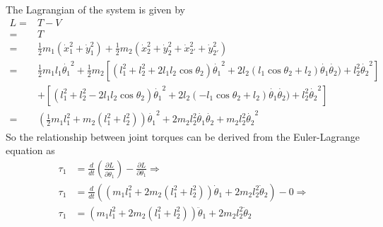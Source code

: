 \documentclass[conference,onecolumn]{IEEEtran}
\begin{document}
\begin{enumerate}
\begin{enumerate}
                        The Lagrangian of the system is given by
                        \begin{align*}
                              L  = & T - V                                                                                                                                                                                                                     \\
                              =    & T                                                                                                                                                                                                                         \\
                              =    & \frac{1}{2} m_1 (\dot{x}_1^2 + \dot{y}_1^2) + \frac{1}{2} m_2 (\dot{x}_2^2 + \dot{y}_2^2 + \dot{x}_{2'}^2 + \dot{y}_{2'}^2)                                                                                               \\
                              =    & \frac{1}{2} m_1 l_1 \dot{\theta_1}^2 + \frac{1}{2} m_2 \left[ (l_1^2 + l_2^2 + 2 l_1 l_2 \cos \theta_2) \dot{\theta_1}^2 + 2 l_2 (l_1 \cos \theta_2 + l_2) \dot{\theta_1}\dot{\theta_2}) + l_2^2 \dot{\theta_2}^2 \right] \\
                                   & + \left[ (l_1^2 + l_2^2 - 2 l_1 l_2 \cos \theta_2) \dot{\theta_1}^2 + 2 l_2 (- l_1 \cos \theta_2 + l_2) \dot{\theta_1}\dot{\theta_2}) + l_2^2 \dot{\theta_2}^2 \right]                                                    \\
                              =    & \left( \frac{1}{2} m_1 l_1^2 + m_2 (l_1^2 + l_2^2) \right) \dot{\theta_1}^2 + 2 m_2 l_2^2 \dot{\theta_1} \dot{\theta_2} + m_2 l_2^2 \dot{\theta_2}^2
                        \end{align*}
                        So the relationship between joint torques can be derived from the Euler-Lagrange equation as
                        \begin{align*}
                              \tau_1 & = \frac{d}{dt} \left( \frac{\partial L}{\partial \dot{\theta}_1} \right) - \frac{\partial L}{\partial \theta_1} \Rightarrow                \\
                              \tau_1 & = \frac{d}{dt} \left( \left( m_1 l_1^2 + 2 m_2 (l_1^2 + l_2^2) \right) \dot{\theta}_1 + 2 m_2 l_2^2 \dot{\theta}_2 \right) - 0 \Rightarrow \\
                              \tau_1 & = \left( m_1 l_1^2 + 2 m_2 (l_1^2 + l_2^2) \right) \ddot{\theta}_1 + 2 m_2 l_2^2 \ddot{\theta}_2

\end{align*}
\end{enumerate}
\end{enumerate}
\end{document}
